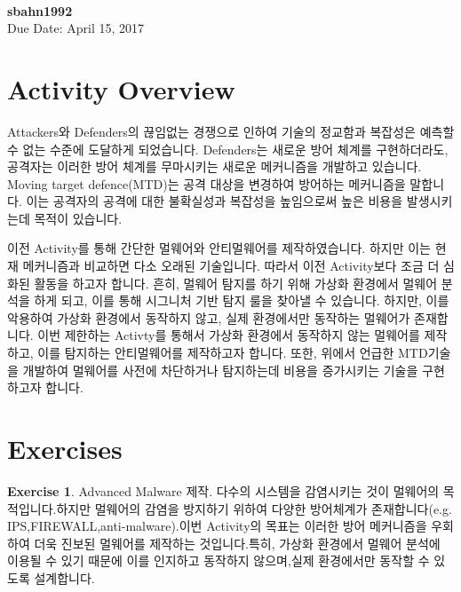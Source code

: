 \documentclass[a4paper, 11pt]{article}
\theoremstyle{definition}
\newtheorem{exercise}{Exercise}
\begin{document}
 \\
         {\phantom{} \hfill \textbf{sbahn1992}} \\
         {\phantom{} \hfill Due Date: April 15, 2017} \\

\section{Activity Overview}

Attackers와 Defenders의 끊임없는 경쟁으로 인하여 기술의 정교함과 복잡성은 예측할 수 없는 수준에 도달하게 되었습니다. Defenders는 새로운 방어 체계를 구현하더라도, 공격자는 이러한 방어 체계를 무마시키는 새로운 메커니즘을 개발하고 있습니다. Moving target defence(MTD)는 공격 대상을 변경하여 방어하는 메커니즘을 말합니다. 이는 공격자의 공격에 대한 불확실성과 복잡성을 높임으로써 높은 비용을 발생시키는데 목적이 있습니다.

이전 Activity를 통해 간단한 멀웨어와 안티멀웨어를 제작하였습니다. 하지만 이는 현재 메커니즘과 비교하면 다소 오래된 기술입니다. 따라서 이전 Activity보다 조금 더 심화된 활동을 하고자 합니다. 흔히, 멀웨어 탐지를 하기 위해 가상화 환경에서 멀웨어 분석을 하게 되고, 이를 통해 시그니처 기반 탐지 룰을 찾아낼 수 있습니다. 하지만, 이를 악용하여 가상화 환경에서 동작하지 않고, 실제 환경에서만 동작하는 멀웨어가 존재합니다. 이번 제한하는 Activty를 통해서 가상화 환경에서 동작하지 않는 멀웨어를 제작하고, 이를 탐지하는 안티멀웨어를 제작하고자 합니다. 또한, 위에서 언급한 MTD기술을 개발하여 멀웨어를 사전에 차단하거나 탐지하는데 비용을 증가시키는 기술을 구현하고자 합니다.

\section{Exercises}

\begin{exercise}

  Advanced Malware 제작.
  다수의 시스템을 감염시키는 것이 멀웨어의 목적입니다.하지만 멀웨어의 감염을 방지하기 위하여 다양한 방어체계가 존재합니다(e.g. IPS,FIREWALL,anti-malware).이번 Activity의 목표는 이러한 방어 메커니즘을 우회하여 더욱 진보된 멀웨어를 제작하는 것입니다.특히, 가상화 환경에서 멀웨어 분석에 이용될 수 있기 때문에 이를 인지하고 동작하지 않으며,실제 환경에서만 동작할 수 있도록 설계합니다.

\end{exercise}
\end{document}
